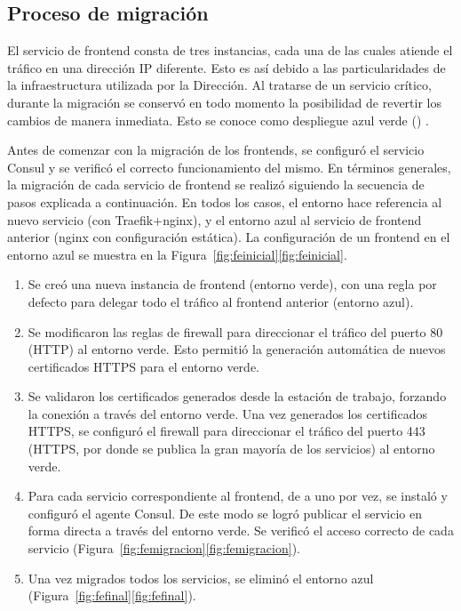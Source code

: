 \subsection{Proceso de migración}
%
El servicio de frontend consta de tres instancias, cada una de las
cuales atiende el tráfico en una dirección IP diferente. Esto es así
debido a las particularidades de la infraestructura utilizada por la
Dirección. Al tratarse de un servicio crítico, durante la migración se
conservó en todo momento la posibilidad de revertir los cambios de
manera inmediata. Esto se conoce como despliegue azul verde
() \cite{bluegreen}.

Antes de comenzar con la migración de los frontends, se configuró el
servicio Consul y se verificó el correcto funcionamiento del mismo. En
términos generales, la migración de cada servicio de frontend se
realizó siguiendo la secuencia de pasos explicada a continuación. En
todos los casos, el entorno  hace referencia al nuevo
servicio (con Traefik+nginx), y el entorno azul al servicio de
frontend anterior (nginx con configuración estática). La configuración
de un frontend en el entorno azul se muestra en la
\iflatexml{}Figura~\ref{fig:feinicial}\else\autoref{fig:feinicial}\fi.
%
\begin{enumerate}
\item Se creó una nueva instancia de frontend (entorno verde), con una
  regla por defecto para delegar todo el tráfico al frontend anterior
  (entorno azul).
\item Se modificaron las reglas de firewall para direccionar el
  tráfico del puerto 80 (HTTP) al entorno verde. Esto permitió la
  generación automática de nuevos certificados HTTPS para el entorno
  verde.
\item Se validaron los certificados generados desde la estación de
  trabajo, forzando la conexión a través del entorno verde. Una vez
  generados los certificados HTTPS, se configuró el firewall para
  direccionar el tráfico del puerto 443 (HTTPS, por donde se publica
  la gran mayoría de los servicios) al entorno verde.
\item Para cada servicio correspondiente al frontend, de a uno por
  vez, se instaló y configuró el agente Consul. De este modo se logró
  publicar el servicio en forma directa a través del entorno verde. Se
  verificó el acceso correcto de cada servicio
  (\iflatexml{}Figura~\ref{fig:femigracion}\else\autoref{fig:femigracion}\fi).
\item Una vez migrados todos los servicios, se eliminó el entorno azul
  (\iflatexml{}Figura~\ref{fig:fefinal}\else\autoref{fig:fefinal}\fi).
\end{enumerate}
%
